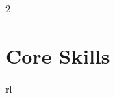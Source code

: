 \documentclass[11pt]{article} %
\begin{document}
\begin{paracol}{2}









\section{Core Skills} 





\begin{supertabular}{rl} %

	


	
	

\end{supertabular}
\end{paracol}
\end{document}
